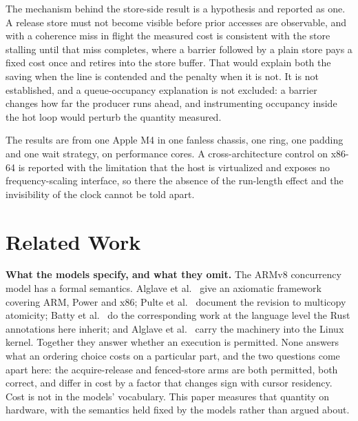 \documentclass[conference]{IEEEtran}
\begin{document}
The mechanism behind the store-side result is a hypothesis and reported as one.
A release store must not become visible before prior accesses are observable,
and with a coherence miss in flight the measured cost is consistent with the
store stalling until that miss completes, where a barrier followed by a plain
store pays a fixed cost once and retires into the store buffer. That would
explain both the saving when the line is contended and the penalty when it is
not. It is not established, and a queue-occupancy explanation is not excluded:
a barrier changes how far the producer runs ahead, and instrumenting occupancy
inside the hot loop would perturb the quantity measured.

The results are from one Apple M4 in one fanless chassis, one ring, one padding
and one wait strategy, on performance cores. A cross-architecture control on
x86-64 is reported with the limitation that the host is virtualized and exposes
no frequency-scaling interface, so there the absence of the run-length effect
and the invisibility of the clock cannot be told apart.

\section{Related Work}

\textbf{What the models specify, and what they omit.} The ARMv8 concurrency
model has a formal semantics. Alglave et al.~\cite{alglave2014herding} give an
axiomatic framework covering ARM, Power and x86; Pulte et
al.~\cite{pulte2018simplifying} document the revision to multicopy atomicity;
Batty et al.~\cite{batty2011mathematizing} do the corresponding work at the
language level the Rust annotations here inherit; and Alglave et
al.~\cite{alglave2018frightening} carry the machinery into the Linux kernel.
Together they answer whether an execution is permitted. None answers what an
ordering choice costs on a particular part, and the two questions come apart
here: the acquire-release and fenced-store arms are both permitted, both
correct, and differ in cost by a factor that changes sign with cursor
residency. Cost is not in the models' vocabulary. This paper measures that
quantity on hardware, with the semantics held fixed by the models rather than
argued about.
\end{document}

